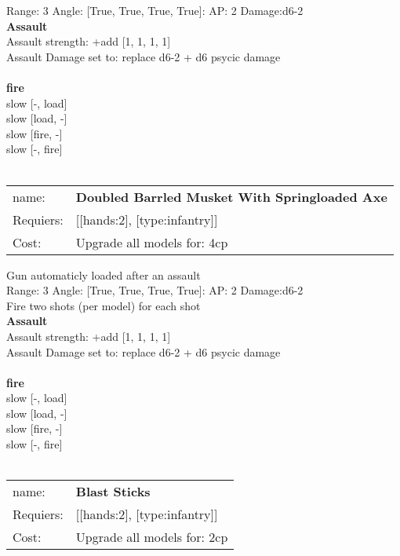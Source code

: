 Range: 3  Angle: [True, True, True, True]: AP: 2 Damage:d6-2 \\



{\bf Assault} \ \\
Assault strength: +add [1, 1, 1, 1] 
\\ 
Assault Damage set to: replace d6-2 + d6 psycic damage
\\ 



\ \\ {\bf fire } \\
slow [-, load] \\
slow [load, -] \\
slow [fire, -] \\
slow [-, fire] \\

\ \\
\begin{tabular}{ll}
name: & {\bf Doubled Barrled Musket With Springloaded Axe } \\
Requiers: & [[hands:2], [type:infantry]] \\
Cost: & Upgrade all models for: 4cp \\
\end{tabular}

Gun automaticly loaded after an assault\\ 


Range: 3  Angle: [True, True, True, True]: AP: 2 Damage:d6-2 \\
Fire two shots (per model) for each shot\\ 



{\bf Assault} \ \\
Assault strength: +add [1, 1, 1, 1] 
\\ 
Assault Damage set to: replace d6-2 + d6 psycic damage
\\ 



\ \\ {\bf fire } \\
slow [-, load] \\
slow [load, -] \\
slow [fire, -] \\
slow [-, fire] \\

\ \\
\begin{tabular}{ll}
name: & {\bf Blast Sticks } \\
Requiers: & [[hands:2], [type:infantry]] \\
Cost: & Upgrade all models for: 2cp \\
\end{tabular}





